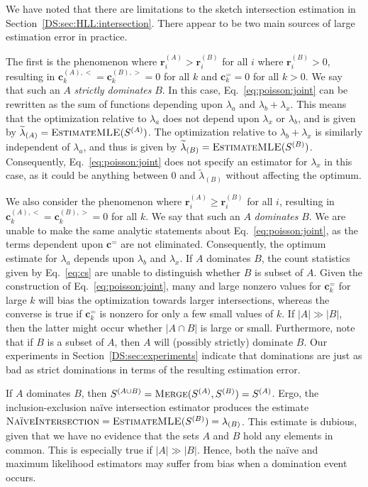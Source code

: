 \documentclass[10]{report}
\newcommand{\algoname}[1]{\textnormal{\textsc{#1}}}
\begin{document}
We have noted that there are limitations to the sketch intersection estimation in Section~\ref{DS:sec:HLL:intersection}.
There appear to be two main sources of large estimation error in practice.

The first is the phenomenon where $\mathbf{r}^{(A)}_i > \mathbf{r}^{(B)}_i$ for all $i$ where $\mathbf{r}^{(B)}_i > 0$, resulting in  $\mathbf{c}^{(A),<}_k = \mathbf{c}^{(B),>}_k = 0$ for all $k$ and $\mathbf{c}^{=}_k = 0$ for all $k > 0$. 
We say that such an $A$ \emph{strictly dominates} $B$. 
In this case, Eq.~\eqref{eq:poisson:joint} can be rewritten as the sum of functions depending upon $\lambda_a$ and $\lambda_b + \lambda_x$. 
This means that the optimization relative to $\lambda_a$ does not depend upon $\lambda_x$ or $\lambda_b$, and is given by $\widetilde{\lambda}_{(A)} = \algoname{EstimateMLE}(S^{(A)})$.
The optimization relative to $\lambda_b + \lambda_x$ is similarly independent of $\lambda_a$, and thus is given by $\widetilde{\lambda}_{(B)} = \algoname{EstimateMLE}(S^{(B)})$.
Consequently, Eq.~\eqref{eq:poisson:joint} does not specify an estimator for $\lambda_x$ in this case, as it could be anything between 0 and $\widetilde{\lambda}_{(B)}$ without affecting the optimum.

We also consider the phenomenon where $\mathbf{r}^{(A)}_i \geq \mathbf{r}^{(B)}_i$ for all $i$, resulting in  $\mathbf{c}^{(A),<}_k = \mathbf{c}^{(B),>}_k = 0$ for all $k$. 
We say that such an $A$ \emph{dominates} $B$. 
We are unable to make the same analytic statements about Eq.~\eqref{eq:poisson:joint}, as the terms dependent upon $\mathbf{c}^{=}$ are not eliminated.
Consequently, the optimum estimate for $\lambda_a$ depends upon $\lambda_b$ and $\lambda_x$. 
If $A$ dominates $B$, the count statistics given by Eq.~\ref{eq:cs} are unable to distinguish whether $B$ is subset of $A$. 
Given the construction of Eq.~\eqref{eq:poisson:joint}, many and large nonzero values for $\mathbf{c}^{=}_k$ for large $k$ will bias the optimization towards larger intersections, whereas the converse is true if $\mathbf{c}^{=}_k$ is nonzero for only a few small values of $k$.
If $|A| \gg |B|$, then the latter might occur whether $|A \cap B|$ is large or small.
Furthermore, note that if $B$ is a subset of $A$, then $A$ will (possibly strictly) dominate $B$. 
Our experiments in Section~\ref{DS:sec:experiments} indicate that dominations are just as bad as strict dominations in terms of the resulting estimation error.

If $A$ dominates $B$, then $S^{(A \cup B)} = \algoname{Merge}(S^{(A)}, S^{(B)}) = S^{(A)}$.
Ergo, the inclusion-exclusion na\"ive intersection estimator produces the estimate $\algoname{Na\"iveIntersection} = \algoname{EstimateMLE}(S^{(B)}) = \lambda_{(B)}$.
This estimate is dubious, given that we have no evidence that the sets $A$ and $B$ hold any elements in common. 
This is especially true if $|A| \gg |B|$.
Hence, both the na\"ive and maximum likelihood estimators may suffer from bias when a domination event occurs.
\end{document}
